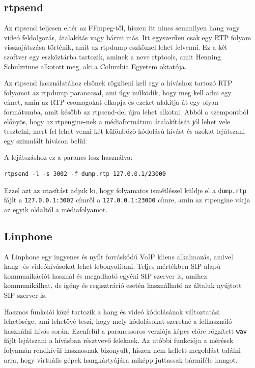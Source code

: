 \subsection{rtpsend}

Az rtpsend \cite{rtpsend} teljesen eltér az FFmpeg-től, hiszen itt nincs semmilyen hang 
vagy videó feldolgozás, átalakítás vagy bármi más. Itt egyszerűen csak egy RTP folyam 
visszajátszása történik, amit az rtpdump eszközzel lehet felvenni. Ez a két 
szoftver egy eszköztárba tartozik, aminek a neve rtptools, amit Henning 
Schulzrinne alkotott meg, aki a Columbia Egyetem oktatója.

Az rtpsend használatához elsőnek rögzíteni kell egy a híváshoz tartozó RTP folyamot az 
rtpdump paranccsal, ami úgy működik, hogy meg kell adni egy címet, amin az RTP csomagokat 
elkapja és ezeket alakítja át egy olyan formátumba, amit később az rtpsend-del újra
lehet alkotni. Abból a szempontból előnyös, hogy az rtpengine-nek a médiaformátum
átalakítását jól lehet vele tesztelni, mert fel lehet venni két különböző kódolású
hívást és azokat lejátszani egy szimulált híváson belül.

A lejátszáshoz ez a parancs lesz használva: 

\begin{lstlisting}[caption=RTP folyam generálásda rtpsend segítségével, label=lst:rtpsend]
rtpsend -l -s 3002 -f dump.rtp 127.0.0.1/23000
\end{lstlisting}

Ezzel azt az utasítást adjuk ki, hogy folyamatos ismétléssel küldje el a 
\texttt{dump.rtp} fájlt a \texttt{127.0.0.1:3002} címről a \texttt{127.0.0.1:23000}
címre, amin az rtpengine várja az egyik oldaltól a médiafolyamot.

\subsection{Linphone}

A Linphone egy ingyenes és nyílt forráskódú VoIP kliens alkalmazás, amivel hang- és 
videóhívásokat lehet lebonyolítani. Teljes mértékben SIP alapú kommunikációt használ és 
megadható egyéni SIP szerver is, amihez kommunikálhat, de igény és regisztráció esetén
használható az általuk nyújtott SIP szerver is. 

Hasznos funkciói közé tartozik a hang és videó kódolásának változtatási lehetősége, ami
lehetővé teszi, hogy mely kódolásokat szeretné a felhasználó használni hívás során.
Ezenfelül a parancssoros verziója képes előre rögzített \texttt{wav} fájlt lejátszani
a hívásban résztvevő feleknek. Az utóbbi funkciója a mérések folyamán rendkívül 
hasznosnak bizonyult, hiszen nem kellett megoldást találni arra, hogy virtuális gépek 
hangkártyájára miképp juttassak bármiféle hangot.

